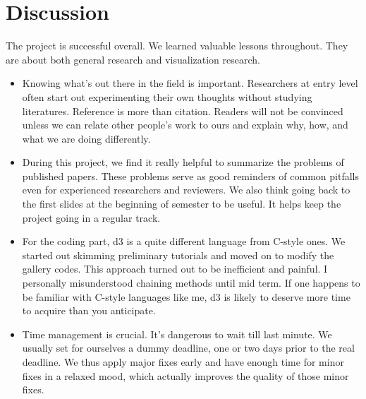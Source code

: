 \section{Discussion}
\label{sec:discussion}

The project is successful overall. We learned valuable lessons throughout. They are about both general research and visualization research.
\begin{itemize}
\item Knowing what's out there in the field is important. Researchers at entry level often start out experimenting their own thoughts without studying literatures. Reference is more than citation. Readers will not be convinced unless we can relate other people's work to ours and explain why, how, and what we are doing differently.
\item During this project, we find it really helpful to summarize the problems of published papers. These problems serve as good reminders of common pitfalls even for experienced researchers and reviewers. We also think going back to the first slides at the beginning of semester to be useful. It helps keep the project going in a regular track.
\item For the coding part, d3 is a quite different language from C-style ones. We started out skimming preliminary tutorials and moved on to modify the gallery codes. This approach turned out to be inefficient and painful. I personally misunderstood chaining methods until mid term. If one happens to be familiar with C-style languages like me, d3 is likely to deserve more time to acquire than you anticipate.
\item Time management is crucial. It's dangerous to wait till last minute. We usually set for ourselves a dummy deadline, one or two days prior to the real deadline. We thus apply major fixes early and have enough time for minor fixes in a relaxed mood, which actually improves the quality of those minor fixes.
\end{itemize}

